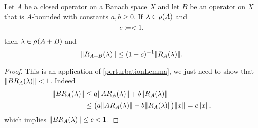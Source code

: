 \begin{lemma} \label{boundOfResolventOfABoundedSum}
Let $A$ be a closed operator on a Banach space $X$ and let $B$ be an operator on $X$ that is $A$-bounded with constants $a,b \geq 0$. If $\lambda\in\rho(A)$ and
\[ c \coloneqq  < 1, \]
then $\lambda\in\rho(A+B)$ and
\[ \lVert R_{A+B}(\lambda)\rVert \leq (1-c)^{-1}\lVert R_A(\lambda)\rVert. \]
\end{lemma}
\begin{proof}
This is an application of \ref{perturbationLemma}, we just need to show that $\lVert BR_A(\lambda)\rVert < 1$. Indeed
\begin{align*}
\lVert BR_A(\lambda)\rVert &\leq a\lVert AR_A(\lambda)\rVert + b\lVert R_A(\lambda)\rVert \\
&\leq \big(a\lVert AR_A(\lambda)\rVert + b\lVert R_A(\lambda)\rVert\big)\lVert x\rVert = c\lVert x\rVert,
\end{align*}
which implies $\lVert BR_A(\lambda)\rVert \leq c < 1$.
\end{proof}

